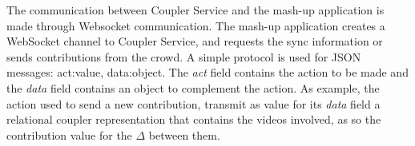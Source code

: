 The communication  between Coupler Service and the mash-up application is made through Websocket communication. The mash-up application creates a WebSocket channel to Coupler Service, and requests the sync information or sends contributions from the crowd. A simple protocol is used for JSON messages: {act:value, data:object}. The \textit{act} field contains the action to be made and the \textit{data} field contains an object to complement the action. As example, the action used to send a new contribution, transmit as value for its \textit{data} field a relational coupler representation that contains the videos involved, as so the contribution value for the $\Delta$ between them.

